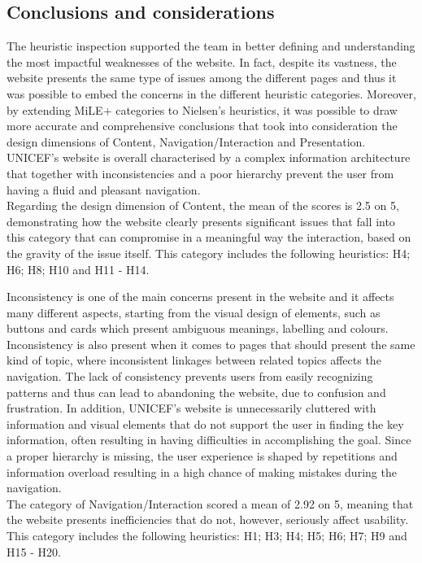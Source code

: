 
\subsection{Conclusions and considerations}

The heuristic inspection supported the team in better defining and understanding the most impactful weaknesses of the website. In fact, despite its vastness, the website presents the same type of issues among the different pages and thus it was possible to embed the concerns in the different heuristic categories. Moreover, by extending MiLE+ categories to Nielsen’s heuristics, it was possible to draw more accurate and comprehensive conclusions that took into consideration the design dimensions of Content, Navigation/Interaction and Presentation.
UNICEF’s website is overall characterised by a complex information architecture that together with inconsistencies and a poor hierarchy prevent the user from having a fluid and pleasant navigation.\\

Regarding the design dimension of Content, the mean of the scores is 2.5 on 5, demonstrating how the website clearly presents significant issues that fall into this category that can compromise in a meaningful way the interaction, based on the gravity of the issue itself. This category includes the following heuristics: H4; H6; H8; H10 and H11 - H14.

Inconsistency is one of the main concerns present in the website and it affects many different aspects, starting from the visual design of elements, such as buttons and cards which present ambiguous meanings, labelling and colours. Inconsistency is also present when it comes to pages that should present the same kind of topic, where inconsistent linkages between related topics affects the navigation. The lack of consistency prevents users from easily recognizing patterns and thus can lead to abandoning the website, due to confusion and frustration.
In addition, UNICEF's website is unnecessarily cluttered with information and visual elements that do not support the user in finding the key information, often resulting in having difficulties in accomplishing the goal. Since a proper hierarchy is missing, the user experience is shaped by repetitions and information overload resulting in a high chance of making mistakes during the navigation.\\

The category of Navigation/Interaction scored a mean of 2.92 on 5, meaning that the website presents inefficiencies that do not, however, seriously affect usability. This category includes the following heuristics: H1; H3; H4; H5; H6; H7; H9 and H15 - H20.

